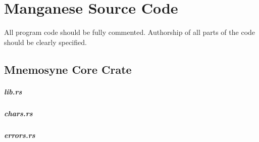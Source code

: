 %
%

\chapter{Manganese Source Code}\label{app:code}
All program code should be fully commented. Authorship
of all parts of the code should be clearly specified.


\section{Mnemosyne Core Crate}
    \paragraph{lib.rs}
%
    \paragraph{chars.rs}
%
    \paragraph{errors.rs}
%

